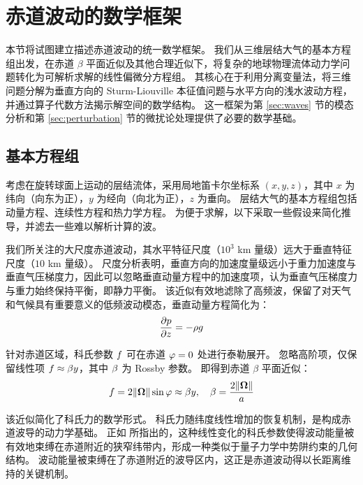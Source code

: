 \section{赤道波动的数学框架}
\label{sec:framework}

本节将试图建立描述赤道波动的统一数学框架。
我们从三维层结大气的基本方程组出发，在赤道 $\beta$ 平面近似及其他合理近似下，将复杂的地球物理流体动力学问题转化为可解析求解的线性偏微分方程组。
其核心在于利用分离变量法，将三维问题分解为垂直方向的 Sturm-Liouville 本征值问题与水平方向的浅水波动方程，并通过算子代数方法揭示解空间的数学结构。
这一框架为第 \ref{sec:waves} 节的模态分析和第 \ref{sec:perturbation} 节的微扰论处理提供了必要的数学基础。

\subsection{基本方程组}
\label{subsec:primitive_equations}

考虑在旋转球面上运动的层结流体，采用局地笛卡尔坐标系 $(x, y, z)$，其中 $x$ 为纬向（向东为正），$y$ 为经向（向北为正），$z$ 为垂向。
层结大气的基本方程组包括动量方程、连续性方程和热力学方程。
为便于求解，以下采取一些假设来简化推导，并滤去一些难以解析计算的波。

我们所关注的大尺度赤道波动，其水平特征尺度（$10^3$ km 量级）远大于垂直特征尺度（$10$ km 量级）。
尺度分析表明，垂直方向的加速度量级远小于重力加速度与垂直气压梯度力，因此可以忽略垂直动量方程中的加速度项，认为垂直气压梯度力与重力始终保持平衡，即静力平衡。
该近似有效地滤除了高频波，保留了对天气和气候具有重要意义的低频波动模态，垂直动量方程简化为：
\begin{equation}
    \pde{\pressure}{z} = -\density \gravityconst
    \label{eq:hydrostatic}
\end{equation}

针对赤道区域，科氏参数 $f$ 可在赤道 $\varphi = 0$ 处进行泰勒展开。
忽略高阶项，仅保留线性项 $f \approx \beta y$，其中 $\beta$ 为 Rossby 参数。
即得到赤道 $\beta$ 平面近似：
\begin{equation}
    f = 2\lVert \bm{\Omega} \rVert \sin\varphi \approx \beta y, \quad \beta = \frac{2\lVert \bm{\Omega} \rVert}{a}
    \label{eq:beta_plane}
\end{equation}

该近似简化了科氏力的数学形式。
科氏力随纬度线性增加的恢复机制，是构成赤道波导的动力学基础。
正如 \citep{matsunoQuasiGeostrophicMotionsEquatorial1966} 所指出的，这种线性变化的科氏参数使得波动能量被有效地束缚在赤道附近的狭窄纬带内，形成一种类似于量子力学中势阱约束的几何结构。
波动能量被束缚在了赤道附近的波导区内，这正是赤道波动得以长距离维持的关键机制。

